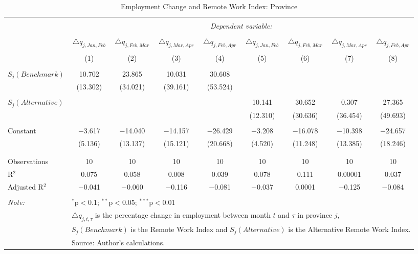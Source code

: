 
\begin{table}[!htbp] \centering 
  \caption{Employment Change and Remote Work Index: Province} 
  \label{tab:regression_dynamics_province} 
\footnotesize 
\begin{tabular}{@{\extracolsep{5pt}}lcccccccc} 
\\[-1.8ex]\hline 
\hline \\[-1.8ex] 
 & \multicolumn{8}{c}{\textit{Dependent variable:}} \\ 
\cline{2-9} 
\\[-1.8ex] & $\triangle q_{j,Jan,Feb}$ & $\triangle q_{j,Feb,Mar}$ & $\triangle q_{j,Mar,Apr}$ & $\triangle q_{j,Feb,Apr}$ & $\triangle q_{j,Jan,Feb}$ & $\triangle q_{j,Feb,Mar}$ & $\triangle q_{j,Mar,Apr}$ & $\triangle q_{j,Feb,Apr}$ \\ 
\\[-1.8ex] & (1) & (2) & (3) & (4) & (5) & (6) & (7) & (8)\\ 
\hline \\[-1.8ex] 
 $S_{j}(Benchmark)$ & 10.702 & 23.865 & 10.031 & 30.608 &  &  &  &  \\ 
  & (13.302) & (34.021) & (39.161) & (53.524) &  &  &  &  \\ 
  & & & & & & & & \\ 
 $S_{j}(Alternative)$ &  &  &  &  & 10.141 & 30.652 & 0.307 & 27.365 \\ 
  &  &  &  &  & (12.310) & (30.636) & (36.454) & (49.693) \\ 
  & & & & & & & & \\ 
 Constant & $-$3.617 & $-$14.040 & $-$14.157 & $-$26.429 & $-$3.208 & $-$16.078 & $-$10.398 & $-$24.657 \\ 
  & (5.136) & (13.137) & (15.121) & (20.668) & (4.520) & (11.248) & (13.385) & (18.246) \\ 
  & & & & & & & & \\ 
\hline \\[-1.8ex] 
Observations & 10 & 10 & 10 & 10 & 10 & 10 & 10 & 10 \\ 
R$^{2}$ & 0.075 & 0.058 & 0.008 & 0.039 & 0.078 & 0.111 & 0.00001 & 0.037 \\ 
Adjusted R$^{2}$ & $-$0.041 & $-$0.060 & $-$0.116 & $-$0.081 & $-$0.037 & 0.0001 & $-$0.125 & $-$0.084 \\ 
\hline 
\hline \\[-1.8ex] 
\textit{Note:}  & \multicolumn{8}{l}{$^{*}$p$<$0.1; $^{**}$p$<$0.05; $^{***}$p$<$0.01} \\ 
 & \multicolumn{8}{l}{$\triangle q_{j,t,\tau}$ is the percentage change in employment between month $t$ and $\tau$ in province $j$,} \\ 
 & \multicolumn{8}{l}{$S_{j} (Benchmark)$ is the Remote Work Index and $S_{j} (Alternative)$ is the Alternative Remote Work Index.} \\ 
 & \multicolumn{8}{l}{Source: Author's calculations.} \\ 
\end{tabular} 
\end{table} 
